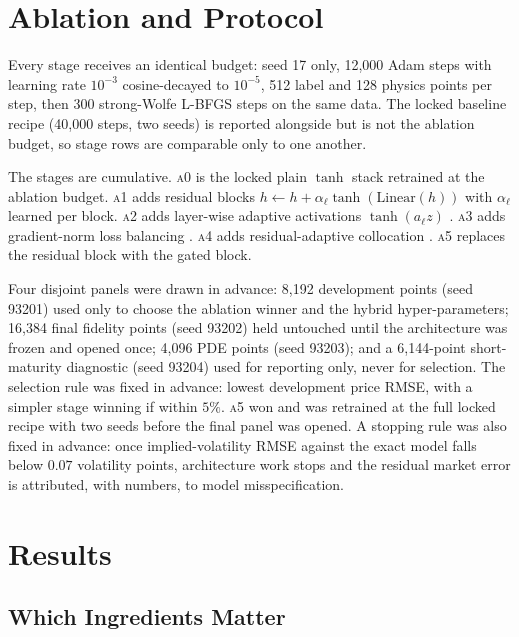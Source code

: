 \documentclass[conference]{IEEEtran}
\begin{document}
\section{Ablation and Protocol}

Every stage receives an identical budget: seed 17 only, 12,000 Adam steps with
learning rate $10^{-3}$ cosine-decayed to $10^{-5}$, 512 label and 128 physics
points per step, then 300 strong-Wolfe L-BFGS steps on the same data. The
locked baseline recipe (40,000 steps, two seeds) is reported alongside but is
not the ablation budget, so stage rows are comparable only to one another.

The stages are cumulative. \textsc{a0} is the locked plain $\tanh$ stack
retrained at the ablation budget. \textsc{a1} adds residual blocks
$h \leftarrow h + \alpha_\ell\tanh(\mathrm{Linear}(h))$ with $\alpha_\ell$
learned per block. \textsc{a2} adds layer-wise adaptive activations
$\tanh(a_\ell z)$ \cite{jagtap2020}. \textsc{a3} adds gradient-norm loss
balancing \cite{wang2021}. \textsc{a4} adds residual-adaptive collocation
\cite{wu2023}. \textsc{a5} replaces the residual block with the gated block.

Four disjoint panels were drawn in advance: 8,192 development points (seed
93201) used only to choose the ablation winner and the hybrid
hyper-parameters; 16,384 final fidelity points (seed 93202) held untouched
until the architecture was frozen and opened once; 4,096 PDE points (seed
93203); and a 6,144-point short-maturity diagnostic (seed 93204) used for
reporting only, never for selection. The selection rule was fixed in advance:
lowest development price RMSE, with a simpler stage winning if within $5\%$.
\textsc{a5} won and was retrained at the full locked recipe with two seeds
before the final panel was opened. A stopping rule was also fixed in advance:
once implied-volatility RMSE against the exact model falls below $0.07$
volatility points, architecture work stops and the residual market error is
attributed, with numbers, to model misspecification.

\section{Results}

\subsection{Which Ingredients Matter}
\end{document}
